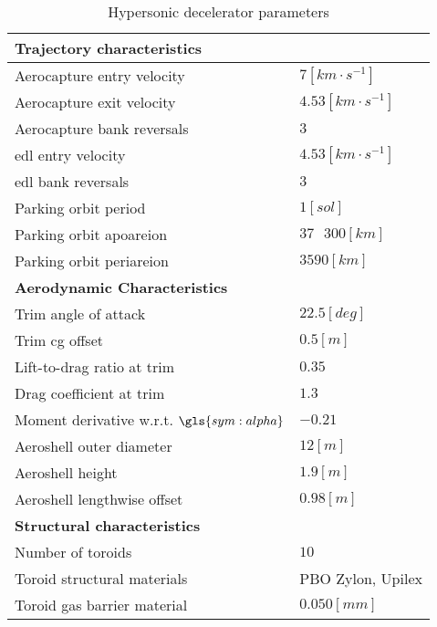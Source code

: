 \begin{table}[H]
	\centering
	\caption{Hypersonic decelerator parameters}
	\label{tab:DeceleratorPar}
	\begin{tabular}{|p{}|p{}|} \hline
		\textbf{Trajectory characteristics}             	& 			\\ \hline \hline
		Aerocapture entry velocity       				&	 $7 \left[km \cdot s^{-1}\right]$ 		\\ \hline
		Aerocapture exit velocity				 		&    $4.53 \left[km \cdot s^{-1}\right]$  	  	\\ \hline
		Aerocapture bank reversals				        &  	 $3$		\\ \hline
		\gls{edl} entry velocity					 	&  	 $4.53 \left[km \cdot s^{-1}\right]$	\\ \hline
		\gls{edl} bank reversals					 	&  	 $3$	\\ \hline
		Parking orbit period						 	&  	 $1 \left[sol\right]$		\\ \hline
		Parking orbit apoareion			 				&  	$37\mbox{ }300 \left[km\right]$		\\ \hline
		Parking orbit periareion			 			&  	$3590 \left[km\right]$		\\ \hline
		\textbf{Aerodynamic Characteristics}			&			\\ \hline \hline
		Trim angle of attack				 			&  $22.5 \left[deg\right]$			\\ \hline
		Trim \gls{cg} offset							&  $0.5 \left[m\right]$		\\ \hline
		Lift-to-drag ratio at trim			 			&  	$0.35$	\\ \hline
		Drag coefficient at trim			 			&  	$1.3$	\\ \hline
		Moment derivative w.r.t. $\gls{sym:alpha}$		&  	$-0.21$		\\ \hline
		Aeroshell outer diameter						&  	$12 \left[m\right]$		\\ \hline
		Aeroshell height								&  	$1.9 \left[m\right]$		\\ \hline
		Aeroshell lengthwise offset						&  	$0.98 \left[m\right]$		\\ \hline
		\textbf{Structural characteristics}				&			\\ \hline \hline
		Number of toroids					 			&   $10$			\\ \hline 
		Toroid structural materials						 			&  	PBO Zylon\textsuperscript{\textregistered}, Upilex		\\ \hline
		Toroid gas barrier material		&	$0.050 \left[mm\right]$		\\ \hline

\end{tabular}
\end{table}
